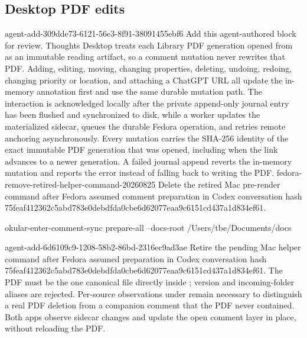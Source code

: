 \subsection*{Desktop PDF edits}
\agentProposedEdit
  {agent-add-309dde73-6121-56e3-8f91-38091455ebf6}
  {Add this agent-authored block for review.}
  {}
  {Thoughts Desktop treats each Library PDF generation opened from  as an immutable reading artifact, so a comment mutation never rewrites that PDF.
Adding, editing, moving, changing properties, deleting, undoing, redoing, changing priority or location, and attaching a ChatGPT URL all update the in-memory annotation first and use the same durable mutation path.
The interaction is acknowledged locally after the private append-only journal entry has been flushed and synchronized to disk, while a worker updates the materialized sidecar, queues the durable Fedora operation, and retries remote anchoring asynchronously.
Every mutation carries the SHA-256 identity of the exact immutable PDF generation that was opened, including when the  link advances to a newer generation.
A failed journal append reverts the in-memory mutation and reports the error instead of falling back to writing the PDF.}
\agentProposedEdit
  {fedora-remove-retired-helper-command-20260825}
  {Delete the retired Mac pre-render command after Fedora assumed comment preparation in Codex conversation hash 75feaf412362c5abd783e0debdfda0cbe6d62077eaa9c6151cd437a1d834ef61.}
  {
\begin{DocCode}
okular-enter-comment-sync prepare-all --docs-root /Users/tbe/Documents/docs
\end{DocCode}}
  {}
\agentProposedEdit
  {agent-add-6d6109c9-1208-58b2-86bd-2316ec9ad3ae}
  {Retire the pending Mac helper command after Fedora assumed preparation in Codex conversation hash 75feaf412362c5abd783e0debdfda0cbe6d62077eaa9c6151cd437a1d834ef61.}
  {}
  {}
The PDF must be the one canonical file directly inside ; version and incoming-folder aliases are rejected.
Per-source observations under  remain necessary to distinguish a real PDF deletion from a companion comment that the PDF never contained.
Both apps observe sidecar changes and update the open comment layer in place, without reloading the PDF.

